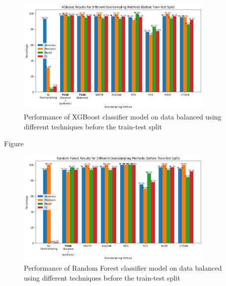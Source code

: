 \documentclass[twoside,11pt]{article}
\begin{document}
\begin{keywords}
\begin{figure}
  \centering
  \includegraphics[width=0.85\textwidth]{images/xgboost_oversample_before_split.png}
  \caption{Performance of XGBoost classifier model on data balanced using different techniques before the train-test split}
  \label{fig:xgboost_oversample_before_split}
\end{figure}

Figure

\begin{figure}
  \centering
  \includegraphics[width=0.85\textwidth]{images/rf_oversample_before_slit.png}
  \caption{Performance of Random Forest classifier model on data balanced using different techniques before the train-test split}
  \label{fig:rf_oversample_before_split}
\end{figure}




\end{keywords}
\end{document}
